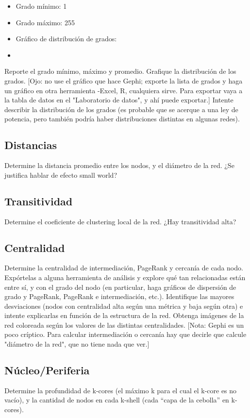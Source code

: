\documentclass[12pt]{article}
\begin{document}
\begin{itemize}
    \item Grado mínimo: 1
    \item Grado máximo: 255
    \item Gráfico de distribución de grados:
    \item 
\end{itemize}
Reporte el grado mínimo, máximo y promedio. Grafique la distribución de los grados. [Ojo: no use el gráfico que hace Gephi; exporte la lista de grados y haga un gráfico en otra herramienta -Excel, R, cualquiera sirve. Para exportar vaya a la tabla de datos en el "Laboratorio de datos", y ahí puede exportar.] Intente describir la distribución de los grados (es probable que se acerque a una ley de potencia, pero también podría haber distribuciones distintas en algunas redes).

\subsection{Distancias} 
Determine la distancia promedio entre los nodos, y el diámetro de la red. ¿Se justifica hablar de efecto small world?

\subsection{Transitividad} 
Determine el coeficiente de clustering local de la red. ¿Hay transitividad alta?

\subsection{Centralidad}  
Determine la centralidad de intermediación, PageRank y cercanía de cada nodo. Expórtelas a alguna herramienta de análisis y explore qué tan relacionadas están entre sí, y con el grado del nodo (en particular, haga gráficos de dispersión de grado y PageRank, PageRank e intermediación, etc.). Identifique las mayores desviaciones (nodos con centralidad alta según una métrica y baja según otra) e intente explicarlas en función de la estructura de la red. Obtenga imágenes de la red coloreada según los valores de las distintas centralidades. [Nota: Gephi es un poco críptico. Para calcular intermediación o cercanía hay que decirle que calcule "diámetro de la red", que no tiene nada que ver.]

\subsection{Núcleo/Periferia}
Determine la profundidad de k-cores (el máximo k para el cual el k-core es no vacío), y la cantidad de nodos en cada k-shell (cada “capa de la cebolla” en k-cores).
\end{document}
